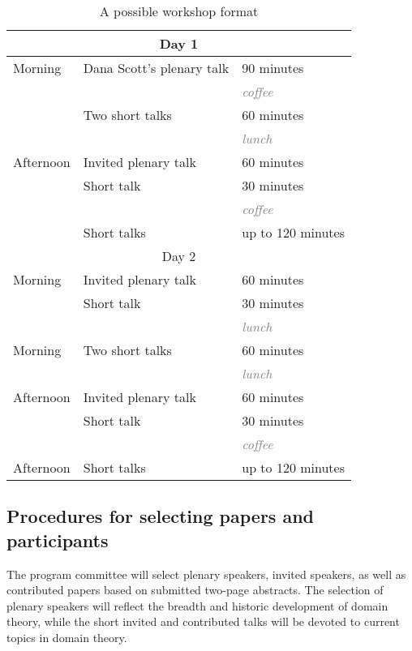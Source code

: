 \documentclass{article}
\newcommand{\grey}{\textcolor{grey}}
\begin{document}
\begin{table}[ht]
  \centering
\begin{tabular}{lll}
\multicolumn{3}{c}{Day 1} \\ \midrule
Morning   & Dana Scott's plenary talk & 90 minutes \\
          &                                & \grey{\emph{coffee}}\\
          & Two short talks                & 60 minutes \\
          &                                & \grey{\emph{lunch}} \\
Afternoon & Invited plenary talk           & 60 minutes \\
          & Short talk                     & 30 minutes \\
          &                                & \grey{\emph{coffee}} \\
          & Short talks                    & up to 120 minutes \\[2ex]
\multicolumn{3}{c}{Day 2} \\ \midrule
Morning   & Invited plenary talk           & 60 minutes \\
          & Short talk                     & 30 minutes \\
          &                                & \grey{\emph{lunch}}  \\
Morning   & Two short talks                & 60 minutes \\
          &                                & \grey{\emph{lunch}}  \\
Afternoon & Invited plenary talk           & 60 minutes \\
          & Short talk                     & 30 minutes \\
          &                                & \grey{\emph{coffee}} \\
Afternoon & Short talks                    & up to 120 minutes \\
\end{tabular}
  \caption{A possible workshop format}
  \label{tab:layout}
\end{table}

\subsection{Procedures for selecting papers and participants}

The program committee will select plenary speakers, invited speakers, as well as
contributed papers based on submitted two-page abstracts. The selection of plenary
speakers will reflect the breadth and historic development of domain theory, while the
short invited and contributed talks will be devoted to current topics in domain theory.
\end{document}
